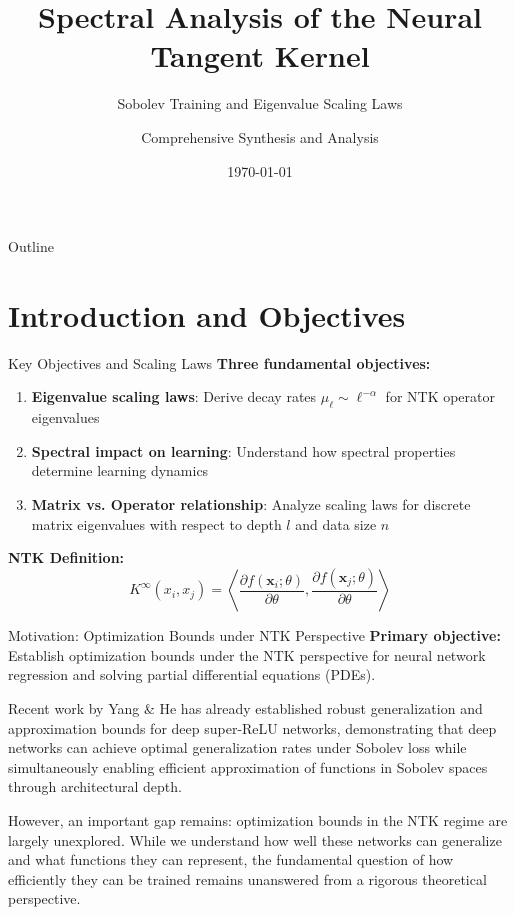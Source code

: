 \documentclass{beamer}
\title{Spectral Analysis of the Neural Tangent Kernel}
\subtitle{Sobolev Training and Eigenvalue Scaling Laws}
\author{Comprehensive Synthesis and Analysis}
\date{\today}
\begin{document}
\begin{frame}
\titlepage
\end{frame}

\begin{frame}{Outline}
\tableofcontents
\end{frame}

\section{Introduction and Objectives}

\begin{frame}{Key Objectives and Scaling Laws}
\textbf{Three fundamental objectives:}
\begin{enumerate}
\item \textbf{Eigenvalue scaling laws}: Derive decay rates $\mu_\ell \sim \ell^{-\alpha}$ for NTK operator eigenvalues
\item \textbf{Spectral impact on learning}: Understand how spectral properties determine learning dynamics
\item \textbf{Matrix vs. Operator relationship}: Analyze scaling laws for discrete matrix eigenvalues with respect to depth $l$ and data size $n$
\end{enumerate}

\textbf{NTK Definition:}
$$K^{\infty}(x_i, x_j) = \left\langle \frac{\partial f(\mathbf{x}_i; \theta)}{\partial \theta}, \frac{\partial f(\mathbf{x}_j; \theta)}{\partial \theta} \right\rangle$$
\end{frame}

\begin{frame}{Motivation: Optimization Bounds under NTK Perspective}
\textbf{Primary objective:} Establish optimization bounds under the NTK perspective for neural network regression and solving partial differential equations (PDEs).

Recent work by Yang \& He has already established robust generalization and approximation bounds for deep super-ReLU networks, demonstrating that deep networks can achieve optimal generalization rates under Sobolev loss while simultaneously enabling efficient approximation of functions in Sobolev spaces through architectural depth.

However, an important gap remains: optimization bounds in the NTK regime are largely unexplored. While we understand how well these networks can generalize and what functions they can represent, the fundamental question of how efficiently they can be trained remains unanswered from a rigorous theoretical perspective.
\end{frame}
\end{document}

